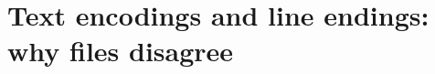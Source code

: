 \chapter{Text encodings and line endings: why files disagree}
\label{ch:text-encodings-and-line-endings-why}


